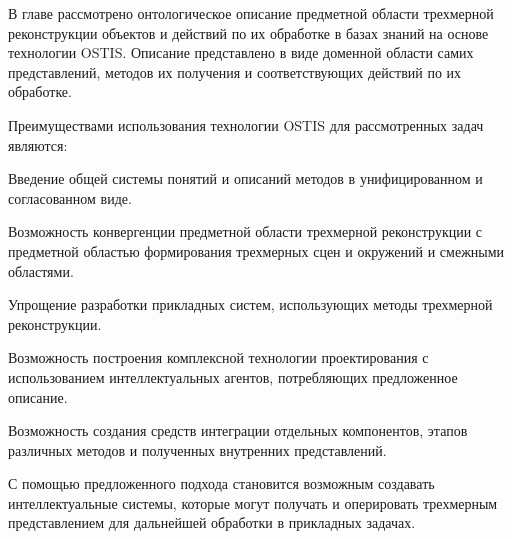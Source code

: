 В главе рассмотрено онтологическое описание предметной области трехмерной реконструкции объектов и действий по их обработке в базах знаний на основе технологии OSTIS. Описание представлено в виде доменной области самих представлений, методов их получения и соответствующих действий по их обработке.

Преимуществами использования технологии OSTIS для рассмотренных задач являются:

\begin{textitemize}
    \item Введение общей системы понятий и описаний методов в унифицированном и согласованном виде.
    \item Возможность конвергенции предметной области трехмерной реконструкции с предметной областью формирования трехмерных сцен и окружений и смежными областями.
    \item Упрощение разработки прикладных систем, использующих методы трехмерной реконструкции.
    \item Возможность построения комплексной технологии проектирования с использованием интеллектуальных агентов, потребляющих предложенное описание.
    \item Возможность создания средств интеграции отдельных компонентов, этапов различных методов и полученных внутренних представлений.
\end{textitemize}

С помощью предложенного подхода становится возможным создавать интеллектуальные системы, которые могут получать и оперировать трехмерным представлением для дальнейшей обработки в прикладных задачах.
